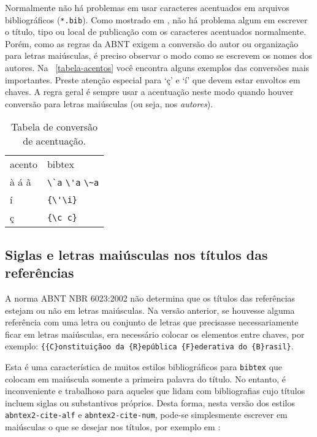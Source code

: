 \documentclass[a4paper]{ltxdoc}
\begin{document}
Normalmente não há problemas em usar caracteres acentuados em arquivos
bibliográficos (\texttt{*.bib}). Como mostrado em \cite{brasil1988}, não há problema algum em escrever o título, tipo ou local de publicação com os caracteres acentuados normalmente. Porém, como as regras da ABNT exigem a conversão do autor ou organização para letras maiúsculas, é preciso observar o modo como se
escrevem os nomes dos autores. Na ~\autoref{tabela-acentos} você encontra alguns
exemplos das conversões mais importantes. Preste atenção especial para `ç' e `í'
que devem estar envoltos em chaves. A regra geral é sempre usar a acentuação
neste modo quando houver conversão para letras maiúsculas (ou seja, nos \textit{autores}). 

\begin{table}[htbp]
\caption{Tabela de conversão de acentuação.}
\label{tabela-acentos}
\begin{center}
\begin{tabular}{ll}
&\\
\toprule
acento & \textsf{bibtex}\\
\midrule
à á ã & \verb+\`a+ \verb+\'a+ \verb+\~a+\\
í & \verb+{\'\i}+\\
ç & \verb+{\c c}+\\
\bottomrule
\end{tabular}
\end{center}
\end{table}

\subsection{Siglas e letras maiúsculas nos títulos das referências}

A norma ABNT NBR 6023:2002 não determina que os títulos das
referências estejam ou não em letras maiúsculas. Na versão anterior, se houvesse alguma referência
com uma letra ou conjunto de letras que precisasse necessariamente ficar em letras maiúsculas, era necessário
colocar os elementos entre chaves, por exemplo: \verb|{{C}onstituiçãoo da {R}epública {F}ederativa do {B}rasil}|.

Esta é uma característica de muitos estilos bibliográficos para \verb|bibtex| que colocam 
em maiúscula somente a primeira palavra do título. No entanto, é inconveniente e trabalhoso para aqueles que lidam com bibliografias cujo títulos incluem siglas ou substantivos próprios. Desta forma, nesta versão dos estilos \verb|abntex2-cite-alf| e \verb|abntex2-cite-num|,
pode-se simplesmente escrever em maiúsculas o que se desejar nos títulos, por exemplo em \cite{brasil1988}:
\end{document}
